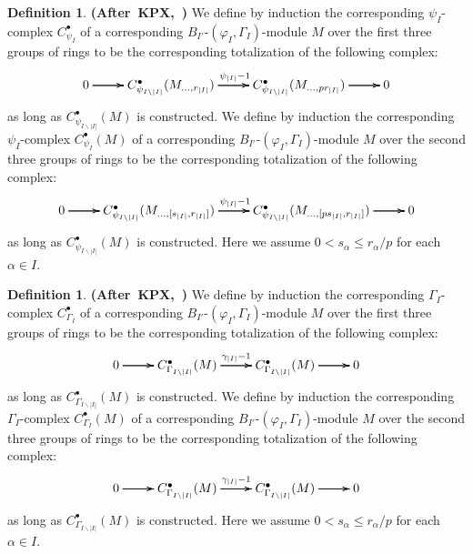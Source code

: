 \documentclass[12pt]{amsart}
\theoremstyle{definition}
\newtheorem{definition}[theorem]{Definition}
\numberwithin{equation}{section}
\begin{document}
\begin{definition} \mbox{\bf{(After KPX, \cite[Definition 2.3.3]{KPX})}}
We define by induction the corresponding $\psi_I$-complex $C^\bullet_{\psi_I}$ of a corresponding $B_{I'}$-$(\varphi_I,\Gamma_I)$-module $M$ over the first three groups of rings 
to be the corresponding totalization of the following complex:
\[
\xymatrix@C+0pc@R+0pc{
0 \ar[r] \ar[r] \ar[r] &C^\bullet_{\psi_{I\backslash |I|}}(M_{...,r_{|I|}}) \ar[r]^{\psi_{|I|}-1}\ar[r]\ar[r] &C^\bullet_{\psi_{I\backslash |I|}}(M_{...,pr_{|I|}}) \ar[r] \ar[r] \ar[r] &0
}
\]
as long as $C^\bullet_{\psi_{I\backslash |I|}}(M)$ is constructed. We define by induction the corresponding $\psi_I$-complex $C^\bullet_{\psi_I}(M)$ of a corresponding $B_{I'}$-$(\varphi_I,\Gamma_I)$-module $M$ over the second three groups of rings
to be the corresponding totalization of the following complex:
\[
\xymatrix@C+0pc@R+0pc{
0 \ar[r] \ar[r] \ar[r] &C^\bullet_{\psi_{I\backslash |I|}}(M_{...,[s_{|I|},r_{|I|}]}) \ar[r]^{\psi_{|I|}-1}\ar[r]\ar[r] &C^\bullet_{\psi_{I\backslash |I|}}(M_{...,[ps_{|I|},r_{|I|}]}) \ar[r] \ar[r] \ar[r] &0
}
\]
as long as $C^\bullet_{\psi_{I\backslash |I|}}(M)$ is constructed. Here we assume $0< s_\alpha \leq r_\alpha/p$ for each $\alpha\in I$.	
\end{definition}



\begin{definition} \mbox{\bf{(After KPX, \cite[Definition 2.3.3]{KPX})}}
We define by induction the corresponding $\Gamma_I$-complex $C^\bullet_{\Gamma_I}$ of a corresponding $B_{I'}$-$(\varphi_I,\Gamma_I)$-module $M$ over 
the first three groups of rings
to be the corresponding totalization of the following complex:
\[
\xymatrix@C+0pc@R+0pc{
0 \ar[r] \ar[r] \ar[r] &C^\bullet_{\Gamma_{I\backslash |I|}}(M) \ar[r]^{\gamma_{|I|}-1}\ar[r]\ar[r] &C^\bullet_{\Gamma_{I\backslash |I|}}(M) \ar[r] \ar[r] \ar[r] &0
}
\]
as long as $C^\bullet_{\Gamma_{I\backslash |I|}}(M)$ is constructed. We define by induction the corresponding $\Gamma_I$-complex $C^\bullet_{\Gamma_I}(M)$ of a corresponding $B_{I'}$-$(\varphi_I,\Gamma_I)$-module $M$ over
the second three groups of rings 	
to be the corresponding totalization of the following complex:
\[
\xymatrix@C+0pc@R+0pc{
0 \ar[r] \ar[r] \ar[r] &C^\bullet_{\Gamma_{I\backslash |I|}}(M) \ar[r]^{\gamma_{|I|}-1}\ar[r]\ar[r] &C^\bullet_{\Gamma_{I\backslash |I|}}(M) \ar[r] \ar[r] \ar[r] &0
}
\]
as long as $C^\bullet_{\Gamma_{I\backslash |I|}}(M)$ is constructed. Here we assume $0< s_\alpha \leq r_\alpha/p$ for each $\alpha\in I$.	
\end{definition}
\end{document}
